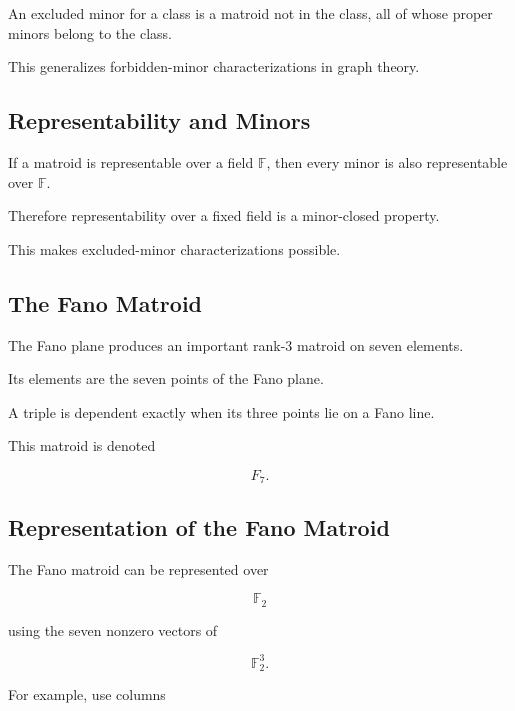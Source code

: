 An excluded minor for a class is a matroid not in the class, all of
whose proper minors belong to the class.

This generalizes forbidden-minor characterizations in graph theory.

\subsection{Representability and Minors}
\label{subsec:representability-minors}

If a matroid is representable over a field \(\mathbb{F}\), then every
minor is also representable over \(\mathbb{F}\).

Therefore representability over a fixed field is a minor-closed
property.

This makes excluded-minor characterizations possible.

\subsection{The Fano Matroid}
\label{subsec:fano-matroid}

The Fano plane produces an important rank-\(3\) matroid on seven
elements.

Its elements are the seven points of the Fano plane.

A triple is dependent exactly when its three points lie on a Fano line.

This matroid is denoted

\[
\boxed{
F_7.
}
\]

\subsection{Representation of the Fano Matroid}
\label{subsec:fano-matroid-representation}

The Fano matroid can be represented over

\[
\mathbb{F}_2
\]

using the seven nonzero vectors of

\[
\mathbb{F}_2^3.
\]

For example, use columns

